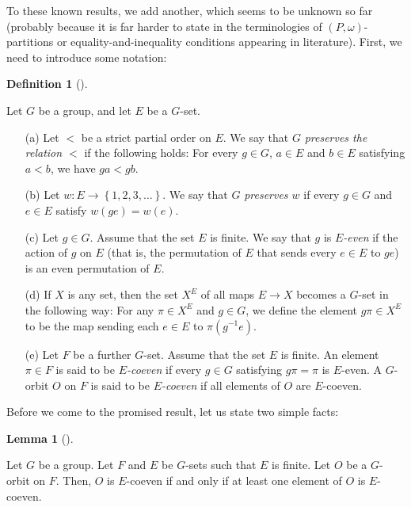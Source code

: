 \documentclass[numbers=enddot,12pt,final,onecolumn,notitlepage,abstracton]{scrartcl}%
\theoremstyle{definition}
\newtheorem{lem}[theo]{Lemma}
\newenvironment{lemma}[1][]
{\begin{lem}[#1]\begin{leftbar}}
{\end{leftbar}\end{lem}}
\newtheorem{defi}[theo]{Definition}
\newenvironment{definition}[1][]
{\begin{defi}[#1]\begin{leftbar}}
{\end{leftbar}\end{defi}}
\begin{document}
To these known results, we add another, which seems to be unknown so
far (probably because it is far harder to state in the terminologies
of $\left(P, \omega\right)$-partitions or
equality-and-inequality conditions appearing in literature). First,
we need to introduce some notation:

\begin{definition}
\label{def.G-sets.terminology}
Let $G$ be a group, and let $E$ be a $G$-set.

\begin{itemize}

\item[(a)] Let $<$ be a
strict partial order on $E$. We say that $G$
\textit{preserves the relation $<$} if the following holds:
For every $g \in G$, $a \in E$ and $b \in E$ satisfying $a < b$,
we have $ga < gb$.

\item[(b)] Let $w : E \to \left\{1, 2, 3, \ldots\right\}$. We
say that $G$ \textit{preserves $w$} if every $g \in G$ and
$e \in E$ satisfy $w\left(ge\right) = w\left(e\right)$.

\item[(c)] Let $g \in G$. Assume that the set $E$ is finite.
We say that $g$ is \textit{$E$-even}
if the action of $g$ on $E$ (that is, the permutation of $E$
that sends every $e \in E$ to $ge$) is an even permutation
of $E$.

\item[(d)] If $X$ is any set, then the set $X^E$ of all maps
$E \to X$ becomes a $G$-set in the following way: For any
$\pi \in X^E$ and $g \in G$, we define the element $g\pi \in X^E$
to be the map sending each $e \in E$ to $\pi\left(g^{-1}e\right)$.

\item[(e)] Let $F$ be a further $G$-set. Assume that the set
$E$ is finite. An element $\pi \in F$
is said to be \textit{$E$-coeven} if every $g \in G$
satisfying $g\pi = \pi$ is $E$-even. A $G$-orbit $O$ on $F$ is said
to be \textit{$E$-coeven} if all elements of $O$ are $E$-coeven.

\end{itemize}
\end{definition}

Before we come to the promised result, let us state two simple facts:

\begin{lemma}
\label{lem.coeven.all-one}
Let $G$ be a group. Let $F$ and $E$ be $G$-sets such that $E$ is
finite. Let $O$ be a
$G$-orbit on $F$. Then, $O$ is $E$-coeven if and only if at least
one element of $O$ is $E$-coeven.
\end{lemma}
\end{document}
